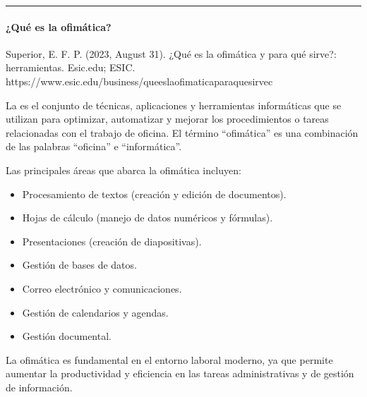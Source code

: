\documentclass[letterpaper,10pt,spanish]{sphinxmanual}
\begin{document}
\bigskip\hrule\bigskip



\paragraph{¿Qué es la ofimática?}
\label{\detokenize{cursos/ofimatica10/recursos/T01:que-es-la-ofimatica}}
\sphinxAtStartPar
%
\begin{footnote}[1]\sphinxAtStartFootnote
Superior, E. F. P. (2023, August 31). ¿Qué es la ofimática y para qué sirve?: herramientas. Esic.edu; ESIC. https://www.esic.edu/business/que\sphinxhyphen{}es\sphinxhyphen{}la\sphinxhyphen{}ofimatica\sphinxhyphen{}para\sphinxhyphen{}que\sphinxhyphen{}sirve\sphinxhyphen{}c
%
\end{footnote} La  es el conjunto de técnicas, aplicaciones y herramientas informáticas que se utilizan para optimizar, automatizar y mejorar los procedimientos o tareas relacionadas con el trabajo de oficina. El término “ofimática” es una combinación de las palabras “oficina” e “informática”.

\sphinxAtStartPar
Las principales áreas que abarca la ofimática incluyen:
\begin{itemize}
\item {} 
\sphinxAtStartPar
Procesamiento de textos (creación y edición de documentos).

\item {} 
\sphinxAtStartPar
Hojas de cálculo (manejo de datos numéricos y fórmulas).

\item {} 
\sphinxAtStartPar
Presentaciones (creación de diapositivas).

\item {} 
\sphinxAtStartPar
Gestión de bases de datos.

\item {} 
\sphinxAtStartPar
Correo electrónico y comunicaciones.

\item {} 
\sphinxAtStartPar
Gestión de calendarios y agendas.

\item {} 
\sphinxAtStartPar
Gestión documental.

\end{itemize}

\sphinxAtStartPar
La ofimática es fundamental en el entorno laboral moderno, ya que permite aumentar la productividad y eficiencia en las tareas administrativas y de gestión de información.
\end{document}
